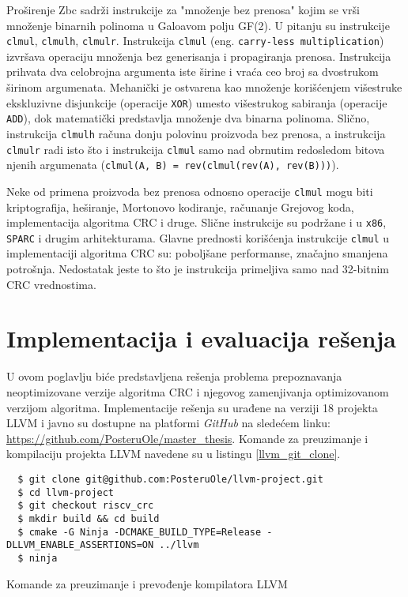 \documentclass[12pt,oneside]{memoir}
\begin{document}
Proširenje Zbc sadrži instrukcije za "množenje bez prenosa" kojim se vrši množenje binarnih polinoma u Galoavom polju GF(2). U pitanju su instrukcije \texttt{clmul}, \texttt{clmulh}, \texttt{clmulr}. %
Instrukcija \texttt{clmul} (eng. \texttt{carry-less multiplication}) izvršava operaciju množenja bez generisanja i propagiranja prenosa. Instrukcija prihvata dva celobrojna argumenta iste širine i vraća ceo broj sa dvostrukom širinom argumenata. Mehanički je ostvarena kao množenje korišćenjem višestruke ekskluzivne disjunkcije (operacije \texttt{XOR}) umesto višestrukog sabiranja (operacije \texttt{ADD}), dok matematički predstavlja množenje dva binarna polinoma. 
Slično, instrukcija \texttt{clmulh} računa donju polovinu proizvoda bez prenosa, a
instrukcija \texttt{clmulr} radi isto što i instrukcija \texttt{clmul} samo nad obrnutim redosledom bitova njenih argumenata (\texttt{clmul(A, B) = rev(clmul(rev(A), rev(B)))}).

Neke od primena proizvoda bez prenosa odnosno operacije \texttt{clmul} mogu biti kriptografija, heširanje, Mortonovo kodiranje, računanje Grejovog koda, implementacija algoritma CRC i druge. Slične instrukcije su podržane i u \texttt{x86}, \texttt{SPARC} i drugim arhitekturama. Glavne prednosti korišćenja instrukcije \texttt{clmul} u implementaciji algoritma CRC su: poboljšane performanse, značajno smanjena potrošnja. Nedostatak jeste to što je instrukcija primeljiva samo nad 32-bitnim CRC vrednostima.

\chapter{Implementacija i evaluacija rešenja}
\label{chap:implementacija}
U ovom poglavlju biće predstavljena rešenja problema prepoznavanja 
neoptimizovane verzije algoritma CRC i njegovog zamenjivanja optimizovanom verzijom algoritma. Implementacije rešenja su urađene na verziji 18 projekta LLVM i javno su dostupne na platformi \textit{GitHub} na sledećem linku: \url{https://github.com/PosteruOle/master_thesis}. Komande za preuzimanje i kompilaciju projekta LLVM navedene su u listingu \ref{llvm_git_clone}.

\begin{listing}[!ht]
\begin{verbatim}
  $ git clone git@github.com:PosteruOle/llvm-project.git
  $ cd llvm-project
  $ git checkout riscv_crc
  $ mkdir build && cd build
  $ cmake -G Ninja -DCMAKE_BUILD_TYPE=Release -DLLVM_ENABLE_ASSERTIONS=ON ../llvm
  $ ninja
\end{verbatim}
\caption{Komande za preuzimanje i prevođenje kompilatora LLVM}
\label{llvm_git_clone}
\end{listing}
\end{document}
